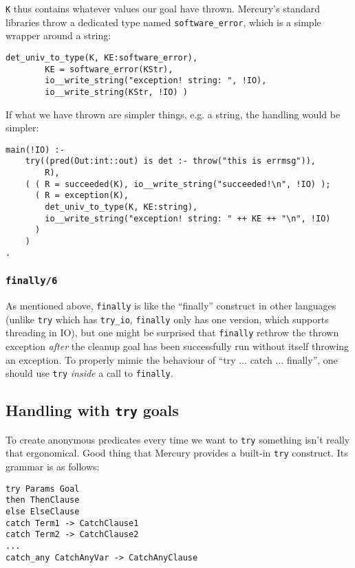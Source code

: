\texttt{K} thus contains whatever values our goal have thrown. Mercury's standard libraries throw a dedicated type named \texttt{software_error}, which is a simple wrapper around a string:

\begin{lstlisting}[language=Mercury]
		det_univ_to_type(K, KE:software_error),
		KE = software_error(KStr),
		io__write_string("exception! string: ", !IO),
		io__write_string(KStr, !IO) )
\end{lstlisting}

If what we have thrown are simpler things, e.g. a string, the handling would be simpler:

\begin{lstlisting}[language=Mercury]
main(!IO) :-
	try((pred(Out:int::out) is det :- throw("this is errmsg")),
		R),
	( ( R = succeeded(K), io__write_string("succeeded!\n", !IO) );
	  ( R = exception(K),
		det_univ_to_type(K, KE:string),
		io__write_string("exception! string: " ++ KE ++ "\n", !IO)
	  )
	)
.
\end{lstlisting}

\subsubsection{\texttt{finally/6}}

As mentioned above, \texttt{finally} is like the ``finally'' construct in other languages (unlike \texttt{try} which has \texttt{try_io}, \texttt{finally} only has one version, which supports threading in IO), but one might be surprised that \texttt{finally} rethrow the thrown exception \textit{after} the cleanup goal has been successfully run without itself throwing an exception. To properly mimic the behaviour of ``try ... catch ... finally'', one should use \texttt{try} \textit{inside} a call to \texttt{finally}.

\subsection{Handling with \texttt{try} goals}

To create anonymous predicates every time we want to \texttt{try} something isn't really that ergonomical. Good thing that Mercury provides a built-in \texttt{try} construct. Its grammar is as follows:

\begin{lstlisting}[language=Mercury]
try Params Goal
then ThenClause
else ElseClause
catch Term1 -> CatchClause1
catch Term2 -> CatchClause2
...
catch_any CatchAnyVar -> CatchAnyClause
\end{lstlisting}

